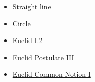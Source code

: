 \begin{dependencies}
\begin{itemize}
  \item \hyperref[def:euclid-straight-line]{Straight line}
  \item \hyperref[def:euclid-circle]{Circle}
  \item \hyperref[thm:euclid-i-2]{Euclid I.2}
  \item \hyperref[ax:euclid-postulate-describe-circle]{Euclid Postulate III}
  \item \hyperref[ax:euclid-common-notion-things-equal-to-same]{Euclid Common Notion I}
\end{itemize}
\end{dependencies}

\clearpage
